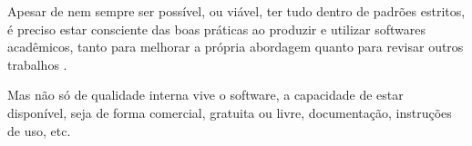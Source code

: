 Apesar de nem sempre ser possível, ou viável, ter tudo dentro de padrões
estritos, é preciso estar consciente das boas práticas ao produzir e utilizar
softwares acadêmicos, tanto para melhorar a própria abordagem quanto para
revisar outros trabalhos \cite{wilson2014best}.

Mas não só de qualidade interna vive o software, a capacidade de estar disponível, seja
de forma comercial, gratuita ou livre, documentação, instruções de uso, etc.

%
%
%
% 
% 
% 



